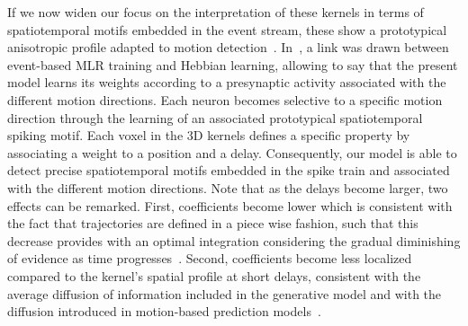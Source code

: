 \documentclass[default]{sn-jnl}%
\theoremstyle{thmstyleone}%
\theoremstyle{thmstyletwo}%
\theoremstyle{thmstylethree}%
\begin{document}
If we now widen our focus on the interpretation of these kernels in terms of spatiotemporal motifs embedded in the event stream, these show a prototypical anisotropic profile adapted to motion detection~\citep{kaplan_anisotropic_2013}. In~\citep{grimaldi_robust_2022}, a link was drawn between event-based MLR training and Hebbian learning, allowing to say that the present model learns its weights according to a presynaptic activity associated with the different motion directions. Each neuron becomes selective to a specific motion direction through the learning of an associated prototypical spatiotemporal spiking motif. Each voxel in the 3D kernels defines a specific property by associating a weight to a position and a delay. Consequently, our model is able to detect precise spatiotemporal motifs embedded in the spike train and associated with the different motion directions. Note that as the delays become larger, two effects can be remarked. First, coefficients become lower which is consistent with the fact that trajectories are defined in a piece wise fashion, such that this decrease provides with an optimal integration considering the gradual diminishing of evidence as time progresses~\citep{Pasturel2020}. Second, coefficients become less localized compared to the kernel's spatial profile at short delays, consistent with the average diffusion of information included in the generative model and with the diffusion introduced in motion-based prediction models~\citep{perrinet_motion-based_2012,khoei_flash-lag_2017}. %
%
%
\end{document}
